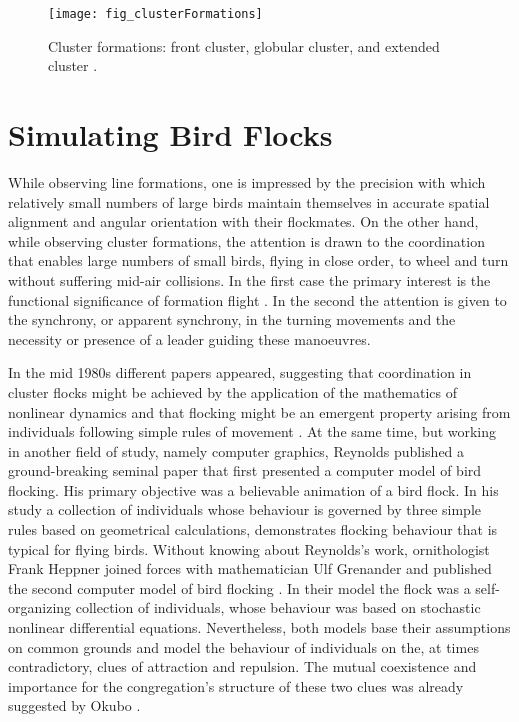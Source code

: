 \begin{figure}
	\texttt{[image: fig\_clusterFormations]}
	\caption{Cluster formations: front cluster, globular cluster, and extended cluster \cite{heppner:1974a}.}
	\label{fig:clusterFormations}
\end{figure}


\section{Simulating Bird Flocks}
While observing line formations, one is impressed by the precision with which relatively small numbers of large birds maintain themselves in accurate spatial alignment and angular orientation with their flockmates. On the other hand, while observing cluster formations, the attention is drawn to the coordination that enables large numbers of small birds, flying in close order, to wheel and turn without suffering mid-air collisions. In the first case the primary interest is the functional significance of formation flight \cite{heppner:1997,speakman:1998}. In the second the attention is given to the synchrony, or apparent synchrony, in the turning movements and the necessity or presence of a leader guiding these manoeuvres.

In the mid 1980s different papers appeared, suggesting that coordination in cluster flocks might be achieved by the application of the mathematics of nonlinear dynamics \cite{okubo:1986} and that flocking might be an emergent property arising from individuals following simple rules of movement \cite{heppner:1987}. At the same time, but working in another field of study, namely computer graphics, Reynolds \cite{reynolds:1987} published a ground-breaking seminal paper that first presented a computer model of bird flocking. His primary objective was a believable animation of a bird flock. In his study a collection of individuals whose behaviour is governed by three simple rules based on geometrical calculations, demonstrates flocking behaviour that is typical for flying birds. Without knowing about Reynolds's work, ornithologist Frank Heppner joined forces with mathematician Ulf Grenander and published the second computer model of bird flocking \cite{heppner:1990}. In their model the flock was a self-organizing collection of individuals, whose behaviour was based on stochastic nonlinear differential equations. Nevertheless, both models base their assumptions on common grounds and model the behaviour of individuals on the, at times contradictory, clues of attraction and repulsion. The mutual coexistence and importance for the congregation's structure of these two clues was already suggested by Okubo \cite{okubo:1980}.

